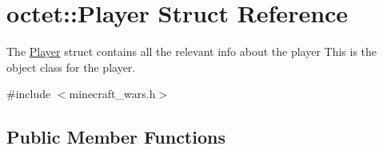 \hypertarget{structoctet_1_1_player}{\section{octet\+:\+:Player Struct Reference}
\label{structoctet_1_1_player}
}


The \hyperlink{structoctet_1_1_player}{Player} struct contains all the relevant info about the player This is the object class for the player.  




{\ttfamily \#include $<$minecraft\+\_\+wars.\+h$>$}

\subsection*{Public Member Functions}

